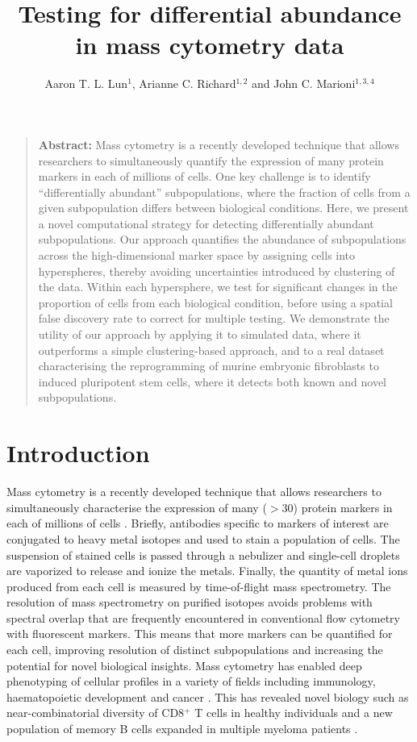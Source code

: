 \documentclass{article}
\title{Testing for differential abundance in mass cytometry data}
\author{Aaron T. L. Lun$^{1}$, Arianne C. Richard$^{1,2}$ and John C. Marioni$^{1,3,4}$}
\date{
\begin{minipage}{0.9\textwidth}
\begin{flushleft} 
\begin{small}
$^1$Cancer Research UK Cambridge Institute, University of Cambridge, Li Ka Shing Centre, Robinson Way, Cambridge CB2 0RE, United Kingdom \\
$^2$Cambridge Institute for Medical Research,  University of Cambridge, Wellcome Trust/MRC Building, Hills Road, Cambridge CB2 0XY, United Kingdom \\
$^3$EMBL European Bioinformatics Institute, Wellcome Genome Campus, Hinxton, Cambridge CB10 1SD, United Kingdom \\
$^4$Wellcome Trust Sanger Institute, Wellcome Genome Campus, Hinxton, Cambridge CB10 1SA, United Kingdom \\
\end{small}
\end{flushleft}
\end{minipage}\\[0.2in]
\today{}
}
\begin{document}
\maketitle

\begin{quote}
\textbf{Abstract:} Mass cytometry is a recently developed technique that allows researchers to simultaneously quantify the expression of many protein markers in each of millions of cells. 
One key challenge is to identify ``differentially abundant'' subpopulations, where the fraction of cells from a given subpopulation differs between biological conditions. 
Here, we present a novel computational strategy for detecting differentially abundant subpopulations.
Our approach quantifies the abundance of subpopulations across the high-dimensional marker space by assigning cells into hyperspheres, thereby avoiding uncertainties introduced by clustering of the data. 
Within each hypersphere, we test for significant changes in the proportion of cells from each biological condition, before using a spatial false discovery rate to correct for multiple testing.
We demonstrate the utility of our approach by applying it to simulated data, where it outperforms a simple clustering-based approach, and to a real dataset characterising the reprogramming of murine embryonic fibroblasts to induced pluripotent stem cells, where it detects both known and novel subpopulations.
\end{quote}

\section{Introduction}
Mass cytometry is a recently developed technique that allows researchers to simultaneously characterise the expression of many ($>30$) protein markers in each of millions of cells \cite{ornatsky2008study}.
Briefly, antibodies specific to markers of interest are conjugated to heavy metal isotopes and used to stain a population of cells.
The suspension of stained cells is passed through a nebulizer and single-cell droplets are vaporized to release and ionize the metals.
Finally, the quantity of metal ions produced from each cell is measured by time-of-flight mass spectrometry.
The resolution of mass spectrometry on purified isotopes avoids problems with spectral overlap that are frequently encountered in conventional flow cytometry with fluorescent markers.
This means that more markers can be quantified for each cell, improving resolution of distinct subpopulations and increasing the potential for novel biological insights.
Mass cytometry has enabled deep phenotyping of cellular profiles in a variety of fields including immunology, haematopoietic development and cancer \cite{leipold2015multiparameter,leelatian2015characterizing,hansmann2015mass,bendall2011singlecell,newell2012cytometry,levine2015datadriven}.
This has revealed novel biology such as near-combinatorial diversity of CD8$^+$ T cells in healthy individuals \cite{newell2012cytometry} and a new population of memory B cells expanded in multiple myeloma patients \cite{hansmann2015mass}.
\end{document}
